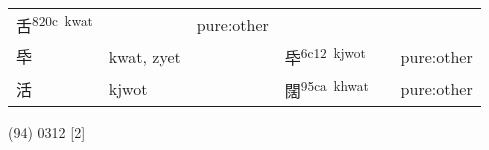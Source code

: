 \documentclass[14pt,a4paper]{scrartcl}
\begin{document}
\begin{longtable}[c]{@{}llllll@{}}
\begin{minipage}[t]{0.14\columnwidth}
舌\textsuperscript{820c~kwat}
\strut\end{minipage} &
\begin{minipage}[t]{0.14\columnwidth}\raggedright\strut
\strut\end{minipage} &
\begin{minipage}[t]{0.14\columnwidth}\raggedright\strut
pure:other
\strut\end{minipage}\tabularnewline
\begin{minipage}[t]{0.14\columnwidth}\raggedright\strut
氒
\strut\end{minipage} &
\begin{minipage}[t]{0.14\columnwidth}\raggedright\strut
kwat, zyet
\strut\end{minipage} &
\begin{minipage}[t]{0.14\columnwidth}\raggedright\strut
\strut\end{minipage} &
\begin{minipage}[t]{0.14\columnwidth}\raggedright\strut
氒\textsuperscript{6c12~kjwot}
\strut\end{minipage} &
\begin{minipage}[t]{0.14\columnwidth}\raggedright\strut
\strut\end{minipage} &
\begin{minipage}[t]{0.14\columnwidth}\raggedright\strut
pure:other
\strut\end{minipage}\tabularnewline
\begin{minipage}[t]{0.14\columnwidth}\raggedright\strut
活
\strut\end{minipage} &
\begin{minipage}[t]{0.14\columnwidth}\raggedright\strut
kjwot
\strut\end{minipage} &
\begin{minipage}[t]{0.14\columnwidth}\raggedright\strut
\strut\end{minipage} &
\begin{minipage}[t]{0.14\columnwidth}\raggedright\strut
闊\textsuperscript{95ca~khwat}
\strut\end{minipage} &
\begin{minipage}[t]{0.14\columnwidth}\raggedright\strut
\strut\end{minipage} &
\begin{minipage}[t]{0.14\columnwidth}\raggedright\strut
pure:other
\strut\end{minipage}\tabularnewline
\bottomrule
\end{longtable}

(94) 0312 {[}2{]}
\end{document}
